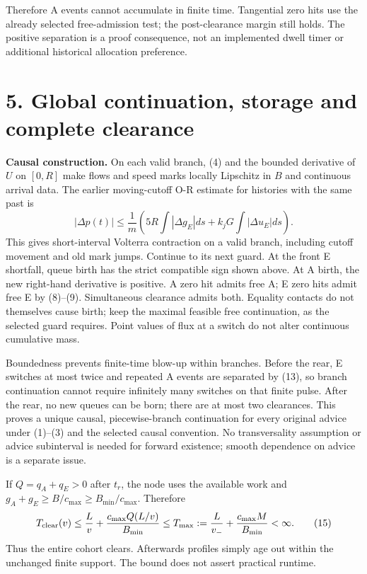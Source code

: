 \documentclass[11pt,a4paper]{article}
\begin{document}
Therefore A events cannot accumulate in finite time. Tangential zero hits
use the already selected free-admission test; the post-clearance margin
still holds. The positive separation is a proof consequence, not an
implemented dwell timer or additional historical allocation preference.

\newpage
\section*{5. Global continuation, storage and complete clearance}
\textbf{Causal construction.} On each valid branch, (4) and the bounded
derivative of $U$ on $[0,R]$ make flows and speed marks locally Lipschitz
in $B$ and continuous arrival data. The earlier moving-cutoff O-R estimate
for histories with the same past is
\begin{equation}
 |\Delta p(t)|\leq\frac1m\left(
 5R\int|\Delta g_E|ds+k_jG\int|\Delta u_E|ds\right).\tag{14}
\end{equation}
This gives short-interval Volterra contraction on a valid branch, including
cutoff movement and old mark jumps. Continue to its next guard. At the
front E shortfall, queue birth has the strict compatible sign shown above.
At A birth, the new right-hand derivative is positive. A zero hit admits
free A; E zero hits admit free E by (8)--(9). Simultaneous clearance admits
both. Equality contacts do not themselves cause birth; keep the maximal
feasible free continuation, as the selected guard requires. Point values
of flux at a switch do not alter continuous cumulative mass.

Boundedness prevents finite-time blow-up within branches. Before the rear,
E switches at most twice and repeated A events are separated by (13), so
branch continuation cannot require infinitely many switches on that finite
pulse. After the rear, no new queues can be born; there are at most two
clearances. This proves a unique causal, piecewise-branch continuation for
every original advice under (1)--(3) and the selected causal convention.
No transversality assumption or advice subinterval is needed for forward
existence; smooth dependence on advice is a separate issue.

If $Q=q_A+q_E>0$ after $t_r$, the node uses the available work and
$g_A+g_E\geq B/c_{\max}\geq B_{\min}/c_{\max}$. Therefore
\begin{equation}
 T_{\rm clear}(v)\leq\frac Lv+
        \frac{c_{\max}Q(L/v)}{B_{\min}}
 \leq T_{\max}:=\frac L{v_-}+\frac{c_{\max}M}{B_{\min}}<\infty.\tag{15}
\end{equation}
Thus the entire cohort clears. Afterwards profiles simply age out within
the unchanged finite support. The bound does not assert practical runtime.
\end{document}
